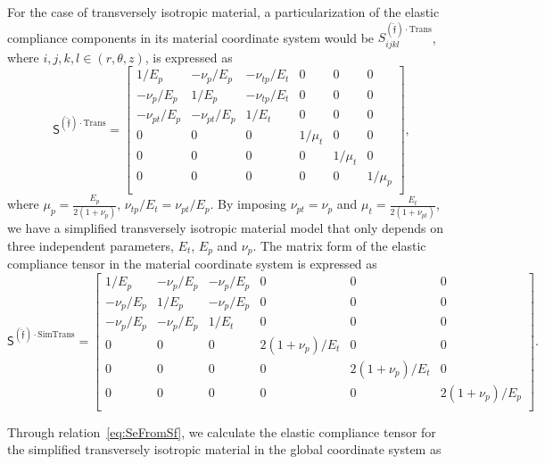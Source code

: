 \documentclass[preprint,12pt,times]{elsarticle}
\numberwithin{equation}{section}
\newcommand{\physf}{\hat{\boldsymbol{\mathfrak{f}}}}
\renewcommand{\u}[1]{\boldsymbol{#1}}
\newcommand{\usf}[1]{\u{\mathsf #1}}
\newcommand{\pr}[1]{\left( #1 \right)}
\newcommand{\incylinder}{\in(r,\theta, z)}
\renewcommand{\>}{$\Rightarrow$}
\begin{document}
For the case of transversely isotropic material, a particularization of the elastic compliance components in its material coordinate system would be $S_{ijkl}^{\pr{\physf}\cdot \mathrm{Trans}}$, where $i,j,k,l \incylinder$, is expressed as
\begin{equation}
  \usf{S}^{\pr{\physf}\cdot \mathrm{Trans}}
  =
  \left[
      \begin{array}{cccccc}
       1/E_p & -\nu_p/E_p & -\nu_{tp}/E_t & 0 & 0 & 0 \\
       -\nu_p/E_p & 1/E_p & -\nu_{tp}/E_t & 0 & 0 & 0 \\
       -\nu_{pt}/E_p & -\nu_{pt}/E_p & 1/E_t & 0 & 0 & 0 \\
       0 & 0 & 0 & 1/\mu_t & 0 & 0 \\
       0 & 0 & 0 & 0 & 1/\mu_t & 0 \\
       0 & 0 & 0 & 0 & 0 & 1/\mu_p \\
      \end{array}
  \right],
\end{equation}
where $\mu_p  = \frac{E_p}{2(1+\nu_p)}$, $\nu_{t p} / E_{t}=\nu_{p t} / E_{p}$. 
By imposing $\nu_{pt} = \nu_{p}$ and $\mu_t  = \frac{E_t}{2(1+\nu_{pt})}$, we have a simplified transversely isotropic material model that only depends on three independent parameters, $E_{t}$, $E_{p}$ and $\nu_{p}$. The matrix form of the elastic compliance tensor in the material coordinate system is expressed as
\begin{equation}
  \usf{S}^{\pr{\physf}\cdot \mathrm{SimTrans}}
  =
  \left[
      \begin{array}{cccccc}
       1/E_p & -\nu_p/E_p & -\nu_{p}/E_p & 0 & 0 & 0 \\
       -\nu_p/E_p & 1/E_p & -\nu_{p}/E_p & 0 & 0 & 0 \\
       -\nu_{p}/E_p & -\nu_{p}/E_p & 1/E_t & 0 & 0 & 0 \\
       0 & 0 & 0 & 2(1+\nu_p)/E_{t} & 0 & 0 \\
       0 & 0 & 0 & 0 & 2(1+\nu_p)/E_{t} & 0 \\
       0 & 0 & 0 & 0 & 0 & 2(1+\nu_p)/E_{p} \\
      \end{array}
  \right].
\end{equation}

Through relation~\eqref{eq:SeFromSf}, we calculate the elastic compliance tensor for the simplified transversely isotropic material in the global coordinate system as
\end{document}
